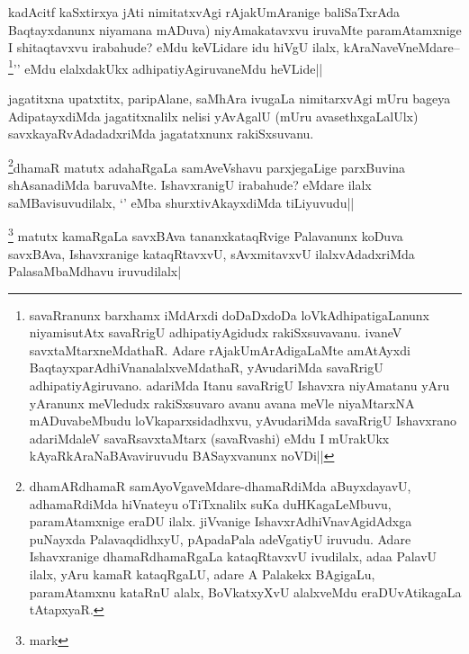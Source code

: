 
\begin{artha}
kadAcitf kaSxtirxya jAti nimitatxvAgi rAjakUmAranige baliSaTxrAda Baqtayxdanunx niyamana mADuva) niyAmakatavxvu iruvaMte paramAtamxnige I shitaqtavxvu irabahude? eMdu keVLidare idu hiVgU ilalx, kAraNaveVneMdare--\footnote{savaRranunx barxhamx iMdArxdi doDaDxdoDa loVkAdhipatigaLanunx niyamisutAtx savaRrigU adhipatiyAgidudx rakiSxsuvavanu. ivaneV savxtaMtarxneMdathaR. Adare rAjakUmArAdigaLaMte amAtAyxdi BaqtayxparAdhiVnanalalxveMdathaR, yAvudariMda savaRrigU adhipatiyAgiruvano. adariMda Itanu savaRrigU Ishavxra niyAmatanu yAru yAranunx meVledudx rakiSxsuvaro avanu avana meVle niyaMtarxNA mADuvabeMbudu loVkaparxsidadhxvu, yAvudariMda savaRrigU Ishavxrano adariMdaleV savaRsavxtaMtarx (savaRvashi) eMdu I mUrakUkx kAyaRkAraNaBAvaviruvudu BASayxvanunx noVDi||}'\stext' eMdu elalxdakUkx adhipatiyAgiruvaneMdu heVLide||
\end{artha}

\begin{artha}
jagatitxna upatxtitx, paripAlane, saMhAra ivugaLa nimitarxvAgi mUru bageya AdipatayxdiMda jagatitxnalilx nelisi yAvAgalU (mUru avasethxgaLalUlx) savxkayaRvAdadadxriMda jagatatxnunx rakiSxsuvanu.
\end{artha}



\begin{artha}
\footnote{dhamARdhamaR samAyoVgaveMdare-dhamaRdiMda aBuyxdayavU, adhamaRdiMda hiVnateyu oTiTxnalilx suKa duHKagaLeMbuvu, paramAtamxnige eraDU ilalx. jiVvanige IshavxrAdhiVnavAgidAdxga puNayxda PalavaqdidhxyU, pApadaPala adeVgatiyU iruvudu. Adare Ishavxranige dhamaRdhamaRgaLa kataqRtavxvU ivudilalx, adaa PalavU ilalx, yAru kamaR kataqRgaLU, adare A Palakekx BAgigaLu, paramAtamxnu kataRnU alalx, BoVkatxyXvU alalxveMdu eraDUvAtikagaLa tAtapxyaR.}dhamaR matutx adahaRgaLa samAveVshavu parxjegaLige parxBuvina shAsanadiMda baruvaMte. IshavxranigU irabahude? eMdare ilalx saMBavisuvudilalx, `\stext' eMba shurxtivAkayxdiMda tiLiyuvudu||
\end{artha}

\begin{artha}
\footnote{mark} matutx kamaRgaLa savxBAva tananxkataqRvige Palavanunx koDuva savxBAva, Ishavxranige kataqRtavxvU, sAvxmitavxvU ilalxvAdadxriMda PalasaMbaMdhavu iruvudilalx|
\end{artha}

